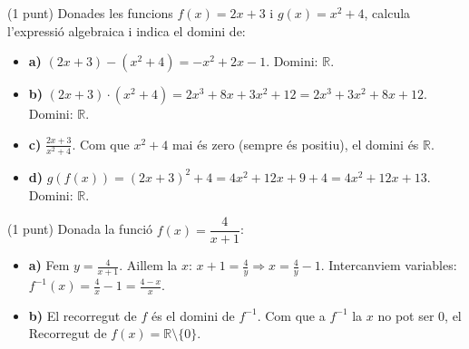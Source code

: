 \documentclass[12pt,a4paper]{exam}
\begin{document}
\begin{questions}
\question (1 punt) Donades les funcions $f(x) = 2x + 3$ i $g(x) = x^2 + 4$, calcula l'expressió algebraica i indica el domini de:

\begin{solution}
\begin{itemize}
    \item \textbf{a)} $(2x+3) - (x^2+4) = -x^2 + 2x - 1$. Domini: $\mathbb{R}$.
    \item \textbf{b)} $(2x+3) \cdot (x^2+4) = 2x^3 + 8x + 3x^2 + 12 = 2x^3 + 3x^2 + 8x + 12$. Domini: $\mathbb{R}$.
    \item \textbf{c)} $\frac{2x+3}{x^2+4}$. Com que $x^2+4$ mai és zero (sempre és positiu), el domini és $\mathbb{R}$.
    \item \textbf{d)} $g(f(x)) = (2x+3)^2 + 4 = 4x^2 + 12x + 9 + 4 = 4x^2 + 12x + 13$. Domini: $\mathbb{R}$.
\end{itemize}
\end{solution}

\question (1 punt) Donada la funció $f(x) = \dfrac{4}{x + 1}$:

\begin{solution}
\begin{itemize}
    \item \textbf{a)} Fem $y = \frac{4}{x+1}$. Aillem la $x$: $x+1 = \frac{4}{y} \Rightarrow x = \frac{4}{y} - 1$. Intercanviem variables: $f^{-1}(x) = \frac{4}{x} - 1 = \frac{4-x}{x}$.
    \item \textbf{b)} El recorregut de $f$ és el domini de $f^{-1}$. Com que a $f^{-1}$ la $x$ no pot ser $0$, el Recorregut de $f(x) = \mathbb{R} \setminus \{0\}$.
\end{itemize}
\end{solution}


\end{questions}
\end{document}
